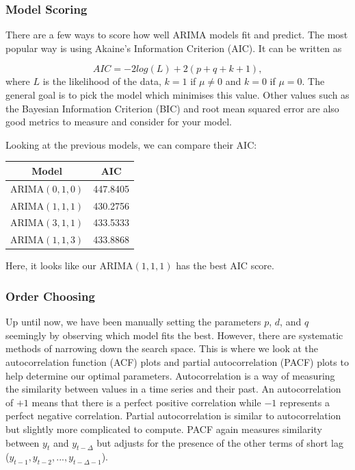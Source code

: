 \documentclass{article}
\begin{document}
  \subsubsection{Model Scoring}
  There are a few ways to score how well ARIMA models fit and predict. The most popular way is using Akaine's Information Criterion (AIC). It can be written as 

  \begin{equation*}
    AIC = -2log(L) + 2(p + q + k + 1),
  \end{equation*}
  where $L$ is the likelihood of the data, $k = 1$ if $\mu \ne 0$ and $k = 0$ if $\mu = 0$. The general goal is to pick the model which minimises this value. Other values such as the Bayesian Information Criterion (BIC) and root mean squared error are also good metrics to measure and consider for your model.

  Looking at the previous models, we can compare their AIC:
  \begin{center}
    \begin{tabular}{||c c||} 
     \hline
     Model & AIC \\ [0.5ex] 
     \hline\hline
     ARIMA$(0,1,0)$ & 447.8405 \\ 
     \hline
     ARIMA$(1,1,1)$ & 430.2756 \\
     \hline
     ARIMA$(3,1,1)$ & 433.5333 \\
     \hline
     ARIMA$(1,1,3)$ & 433.8868 \\
     \hline
    \end{tabular}
  \end{center}
  Here, it looks like our ARIMA$(1,1,1)$ has the best AIC score.

  \newpage
  \subsubsection{Order Choosing}
  Up until now, we have been manually setting the parameters $p$, $d$, and $q$ seemingly by observing which model fits the best. However, there are systematic methods of narrowing down the search space. This is where we look at the autocorrelation function (ACF) plots and partial autocorrelation (PACF) plots to help determine our optimal parameters. Autocorrelation is a way of measuring the similarity between values in a time series and their past. An autocorrelation of $+1$ means that there is a perfect positive correlation while $-1$ represents a perfect negative correlation. Partial autocorrelation is similar to autocorrelation but slightly more complicated to compute. PACF again measures similarity between $y_t$ and $y_{t-\Delta}$ but adjusts for the presence of the other terms of short lag ($y_{t-1}, y_{t-2},...,y_{t-\Delta-1}$).
\end{document}
